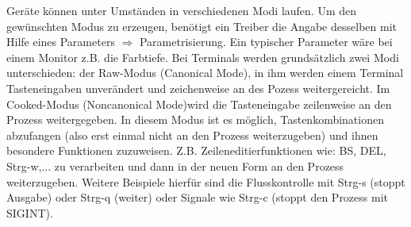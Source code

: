 \begin{answer}
  Geräte können unter Umständen in verschiedenen Modi laufen. Um den gewünschten Modus zu
  erzeugen, benötigt ein Treiber die Angabe desselben mit Hilfe eines Parameters $\Rightarrow$ Parametrisierung.
  Ein typischer Parameter wäre bei einem Monitor z.B. die Farbtiefe.
  Bei Terminals werden grundsätzlich zwei Modi unterschieden: der Raw-Modus (Canonical Mode),
  in ihm werden einem Terminal Tasteneingaben unverändert und zeichenweise an des Pozess
  weitergereicht. Im Cooked-Modus (Noncanonical Mode)wird die Tasteneingabe zeilenweise an den
  Prozess weitergegeben. In diesem Modus ist es möglich, Tastenkombinationen abzufangen (also
  erst einmal nicht an den Prozess weiterzugeben) und ihnen besondere Funktionen zuzuweisen.
  Z.B. Zeileneditierfunktionen wie: BS, DEL, Strg-w,... zu verarbeiten und dann in der neuen Form
  an den Prozess weiterzugeben. Weitere Beispiele hierfür sind die Flusskontrolle mit Strg-s (stoppt
  Ausgabe) oder Strg-q (weiter) oder Signale wie Strg-c (stoppt den Prozess mit SIGINT).
\end{answer}

